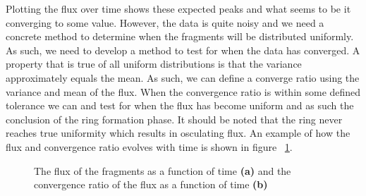 \documentclass[a4paper, 12pt]{article}
\begin{document}
Plotting the flux over time shows these expected peaks and what seems to be it converging to some value. However, the data is quite noisy and we need a concrete method to determine when the fragments will be distributed uniformly. As such, we need to develop a method to test for when the data has converged.
A property that is true of all uniform distributions is that the variance approximately equals the mean. As such, we can define a converge ratio using the variance and mean of the flux. When the convergence ratio is within some defined tolerance we can and test for when the flux has become uniform and as such the conclusion of the ring formation phase. It should be noted that the ring never reaches true uniformity which results in osculating flux. An example of how the flux and convergence ratio evolves with time is shown in figure ~\ref{flux_plots}.

\begin{figure}[t]
	\begin{adjustbox}{max width=1\linewidth,center}
		\centering     %
	\end{adjustbox}
	\caption{The flux of the fragments as a function of time \textbf{(a)} and the convergence ratio of the flux as a function of time \textbf{(b)} }
	\label{flux_plots}
\end{figure}
\end{document}

